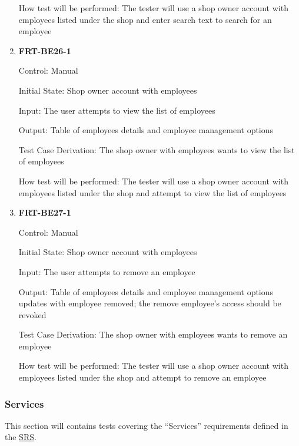 \documentclass[12pt, titlepage]{article}
\begin{document}
\begin{enumerate}
	      How test will be performed: The tester will use a shop owner account with employees listed under
	      the shop and enter search text to search for an employee

	\item \textbf{FRT-BE26-1}

	      Control: Manual

	      Initial State: Shop owner account with employees

	      Input: The user attempts to view the list of employees

	      Output: Table of employees details and employee management options

	      Test Case Derivation: The shop owner with employees wants to view the list of employees

	      How test will be performed: The tester will use a shop owner account with employees listed under
	      the shop and attempt to view the list of employees

	\item \textbf{FRT-BE27-1}

	      Control: Manual

	      Initial State: Shop owner account with employees

	      Input: The user attempts to remove an employee

	      Output: Table of employees details and employee management options updates with employee removed;
	      the remove employee's access should be revoked

	      Test Case Derivation: The shop owner with employees wants to remove an employee

	      How test will be performed: The tester will use a shop owner account with employees listed under
	      the shop and attempt to remove an employee

\end{enumerate}

\subsubsection{Services}

This section will contains tests covering the ``Services'' requirements defined in the
\href{https://github.com/arkinmodi/project-sayyara/blob/main/docs/SRS/SRS.pdf}{SRS}.
\end{document}
